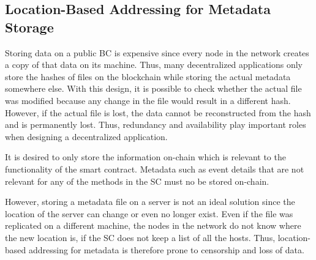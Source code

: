 
\subsection{Location-Based Addressing for Metadata Storage}\label{subsection:metadata-storage}

Storing data on a public BC is expensive since every node in the network creates a copy of that data on its machine. Thus, many decentralized applications only store the hashes of files on the blockchain while storing the actual metadata somewhere else. With this design, it is possible to check whether the actual file was modified because any change in the file would result in a different hash. However, if the actual file is lost, the data cannot be reconstructed from the hash and is permanently lost. Thus, redundancy and availability play important roles when designing a decentralized application.

It is desired to only store the information on-chain which is relevant to the functionality of the smart contract. Metadata such as event details that are not relevant for any of the methods in the SC must no be stored on-chain.

However, storing a metadata file on a server is not an ideal solution since the location of the server can change or even no longer exist. Even if the file was replicated on a different machine, the nodes in the network do not know where the new location is, if the SC does not keep a list of all the hosts. Thus, location-based addressing for metadata is therefore prone to censorship and loss of data. 
